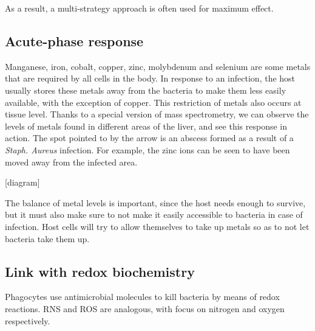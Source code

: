 As a result, a multi-strategy approach is often used for maximum effect.

\subsection{Acute-phase response}
Manganese, iron, cobalt, copper, zinc, molybdenum and selenium are some metals that are required by all cells in the body. In response to an infection, the host usually stores these metals away from the bacteria to make them less easily available, with the exception of copper. This restriction of metals also occurs at tissue level. Thanks to a special version of mass spectrometry, we can observe the levels of metals found in different areas of the liver, and see this response in action. The spot pointed to by the arrow is an abscess formed as a result of a \textit{Staph. Aureus} infection. For example, the zinc ions can be seen to have been moved away from the infected area.

[diagram]

The balance of metal levels is important, since the host needs enough to survive, but it must also make sure to not make it easily accessible to bacteria in case of infection. Host cells will try to allow themselves to take up metals so as to not let bacteria take them up.

\subsection{Link with redox biochemistry}
Phagocytes use antimicrobial molecules to kill bacteria by means of redox reactions. RNS and ROS are analogous, with focus on nitrogen and oxygen respectively.


